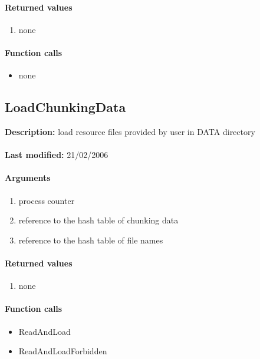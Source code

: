\paragraph{Returned values}
\begin{enumerate}
\item none
\end{enumerate}

\paragraph{Function calls}
\begin{itemize}
\item none
\end{itemize}

\subsection{LoadChunkingData}
\textbf{Description:} load resource files provided by user in DATA directory\\
\\\textbf{Last modified:} 21/02/2006

\paragraph{Arguments}
\begin{enumerate}
\item process counter
\item reference to the hash table of chunking data
\item reference to the hash table of file names
\end{enumerate}

\paragraph{Returned values}
\begin{enumerate}
\item none
\end{enumerate}

\paragraph{Function calls}
\begin{itemize}
\item ReadAndLoad
\item ReadAndLoadForbidden
\end{itemize}

